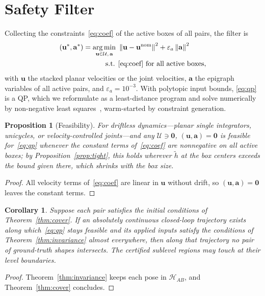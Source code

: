 \documentclass[journal]{IEEEtran}
\newtheorem{proposition}{Proposition}
\newtheorem{corollary}{Corollary}
\theoremstyle{definition}
\newcommand{\norm}[1]{\left\lVert #1\right\rVert}
\DeclareMathOperator*{\argmin}{arg\,min}
\begin{document}
\section{Safety Filter}\label{sec:filter}
Collecting the constraints~\eqref{eq:coef} of the active boxes of all pairs, the filter is
\begin{equation}\label{eq:qp}
\begin{aligned}
(\mathbf u^\ast,\mathbf a^\ast)=\argmin_{\mathbf u\in\mathcal U,\,\mathbf a}\ &\norm{\mathbf u-\mathbf u^{\rm nom}}^2+\varepsilon_a\norm{\mathbf a}^2\\
\text{s.t. }&\eqref{eq:coef}\ \text{for all active boxes},
\end{aligned}
\end{equation}
with $\mathbf u$ the stacked planar velocities or the joint velocities, $\mathbf a$ the epigraph
variables of all active pairs, and $\varepsilon_a=10^{-3}$. With
polytopic input bounds, \eqref{eq:qp} is a QP, which we reformulate as a least-distance program and solve numerically by
non-negative least squares~\cite{lawson1995solving}, warm-started by constraint generation.
\begin{proposition}[Feasibility]\label{prop:feas}
For driftless dynamics---planar single integrators, unicycles, or velocity-controlled joints---and
any $\mathcal U\ni\mathbf 0$, $(\mathbf u,\mathbf a)=\mathbf 0$ is feasible for~\eqref{eq:qp} whenever
the constant terms of~\eqref{eq:coef} are nonnegative on all active boxes; by
Proposition~\ref{prop:tight}, this holds wherever $\tilde h$ at the box centers exceeds the bound given
there, which shrinks with the box size.
\end{proposition}
\begin{proof}
All velocity terms of~\eqref{eq:coef} are linear in $\mathbf u$ without drift, so
$(\mathbf u,\mathbf a)=\mathbf 0$ leaves the constant terms.
\end{proof}
\begin{corollary}\label{cor:closed}
Suppose each pair satisfies the initial conditions of Theorem~\ref{thm:cover}. If an absolutely
continuous closed-loop trajectory exists along which~\eqref{eq:qp} stays feasible and its applied
inputs satisfy the conditions of Theorem~\ref{thm:invariance} almost everywhere, then along that trajectory
no pair of ground-truth shapes intersects. The certified sublevel regions may touch at their
level boundaries.
\end{corollary}
\begin{proof}
Theorem~\ref{thm:invariance} keeps each pose in $\mathcal H_{AB}$, and Theorem~\ref{thm:cover}
concludes.
\end{proof}
\end{document}
